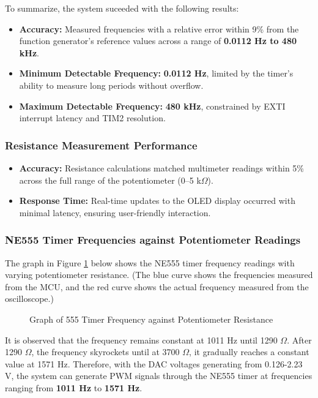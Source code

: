 \noindent To summarize, the system suceeded with the following results:

\begin{itemize}[leftmargin=2em]
    \item \textbf{Accuracy:} Measured frequencies with a relative error within 9\% from the function generator's reference values across a range of \textbf{0.0112 Hz to 480 kHz}.
    \item \textbf{Minimum Detectable Frequency:} \textbf{0.0112 Hz}, limited by the timer's ability to measure long periods without overflow.
    \item \textbf{Maximum Detectable Frequency:} \textbf{480 kHz}, constrained by EXTI interrupt latency and TIM2 resolution.
\end{itemize}

\subsubsection{Resistance Measurement Performance}
\begin{itemize}[leftmargin=2em]
    \item \textbf{Accuracy:} Resistance calculations matched multimeter readings within 5\% across the full range of the potentiometer (0–5 k$\Omega$).
    \item \textbf{Response Time:} Real-time updates to the OLED display occurred with minimal latency, ensuring user-friendly interaction.
\end{itemize}

\subsubsection{NE555 Timer Frequencies against Potentiometer Readings}

The graph in Figure \ref{fig:ne555_graph} below shows the NE555 timer frequency readings with varying potentiometer resistance. (The blue curve shows the frequencies measured from the MCU, and the red curve shows the actual frequency measured from the oscilloscope.)

\begin{figure}[H]
    \centering
    
    \caption{Graph of 555 Timer Frequency against Potentiometer Resistance}
    \label{fig:ne555_graph}
\end{figure}

It is observed that the frequency remains constant at 1011 Hz until 1290 $\Omega$. After 1290 $\Omega$, the frequency skyrockets until at 3700 $\Omega$, it gradually reaches a constant value at 1571 Hz. Therefore, with the DAC voltages generating from 0.126-2.23 V, the system can generate PWM signals through the NE555 timer at frequencies ranging from \textbf{1011 Hz} to \textbf{1571 Hz}.

